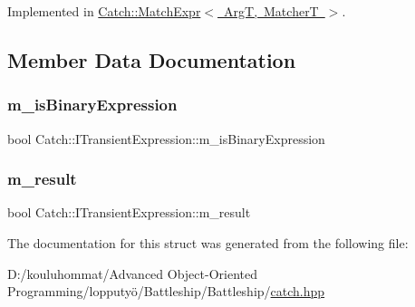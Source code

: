 Implemented in \mbox{\hyperlink{class_catch_1_1_match_expr_ad3e41adb597750b2219bb37e51185629}{Catch\+::\+Match\+Expr$<$ Arg\+T, Matcher\+T $>$}}.



\subsection{Member Data Documentation}
\mbox{\label{struct_catch_1_1_i_transient_expression_a75ce48da824d514d08152d396abb28d8}} 
\subsubsection{\texorpdfstring{m\+\_\+is\+Binary\+Expression}{m\_isBinaryExpression}}
{\footnotesize\ttfamily bool Catch\+::\+I\+Transient\+Expression\+::m\+\_\+is\+Binary\+Expression}

\mbox{\label{struct_catch_1_1_i_transient_expression_a4646e2b5e0156e913653ec3b9b60c942}} 
\subsubsection{\texorpdfstring{m\+\_\+result}{m\_result}}
{\footnotesize\ttfamily bool Catch\+::\+I\+Transient\+Expression\+::m\+\_\+result}



The documentation for this struct was generated from the following file\+:\begin{DoxyCompactItemize}
\item 
D\+:/kouluhommat/\+Advanced Object-\/\+Oriented Programming/lopputyö/\+Battleship/\+Battleship/\mbox{\hyperlink{catch_8hpp}{catch.\+hpp}}\end{DoxyCompactItemize}
